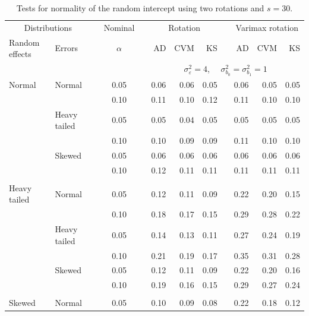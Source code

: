 \documentclass[12pt]{article} %
\begin{document}
\begin{table}[ht]
\caption{Tests for normality of the random intercept using two rotations and $s = 30$.}
\begin{scriptsize}
\begin{center}
\begin{tabular}{ll p{.1cm} c p{.1cm} rrr p{.1cm} rrr}
  \hline
  \multicolumn{2}{c}{Distributions}& & Nominal & &  \multicolumn{3}{c}{Rotation} & & \multicolumn{3}{c}{Varimax rotation} \\ \cline{1-2} \cline{6-8} \cline{10-12}   
  Random effects & Errors & & $\alpha$ & & AD & CVM & KS & & AD & CVM & KS \\ 
   \hline
& && && \multicolumn{7}{c}{$\sigma_{\varepsilon}^2 = 4$, \ \ $\sigma_{b_0}^2 = \sigma_{b_1}^2 = 1$} \\ \cline{6-12}
\rowcolor{gray!20}Normal       & Normal       && 0.05 &&  0.06 & 0.06 & 0.05 && 0.06 & 0.05 & 0.05 \\ 
\rowcolor{gray!20}             &              && 0.10 &&  0.11 & 0.10 & 0.12 && 0.11 & 0.10 & 0.10 \\ 
\rowcolor{gray!20}             & Heavy tailed && 0.05 &&  0.05 & 0.04 & 0.05 && 0.05 & 0.05 & 0.05 \\ 
\rowcolor{gray!20}             &              && 0.10 &&  0.10 & 0.09 & 0.09 && 0.11 & 0.10 & 0.10 \\ 
\rowcolor{gray!20}             & Skewed       && 0.05 &&  0.06 & 0.06 & 0.06 && 0.06 & 0.06 & 0.06 \\ 
\rowcolor{gray!20}             &              && 0.10 &&  0.12 & 0.11 & 0.11 && 0.11 & 0.11 & 0.11 \\ 
             &&&&&&&&&&&\\
Heavy tailed & Normal       && 0.05 &&  0.12 & 0.11 & 0.09 && 0.22 & 0.20 & 0.15 \\ 
             &              && 0.10 &&  0.18 & 0.17 & 0.15 && 0.29 & 0.28 & 0.22 \\ 
             & Heavy tailed && 0.05 &&  0.14 & 0.13 & 0.11 && 0.27 & 0.24 & 0.19 \\ 
             &              && 0.10 &&  0.21 & 0.19 & 0.17 && 0.35 & 0.31 & 0.28 \\ 
             & Skewed       && 0.05 &&  0.12 & 0.11 & 0.09 && 0.22 & 0.20 & 0.16 \\ 
             &              && 0.10 &&  0.19 & 0.16 & 0.15 && 0.29 & 0.27 & 0.24 \\ 
             &&&&&&&&&&&\\
Skewed       & Normal       && 0.05 &&  0.10 & 0.09 & 0.08 && 0.22 & 0.18 & 0.12 \\ 

\end{tabular}
\end{center}
\end{scriptsize}
\end{table}
\end{document}
